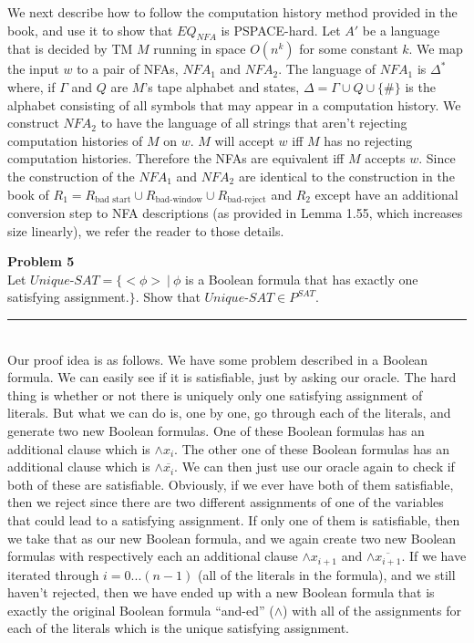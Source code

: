 \documentclass[paper=a4, fontsize=11pt]{scrartcl} %
\numberwithin{equation}{section} %
\numberwithin{figure}{section} %
\numberwithin{table}{section} %
\newcommand{\horrule}[1]{\rule{\linewidth}{#1}} %
\begin{document}
We next describe how to follow the computation history method provided in the book, and use it to show that $EQ_{NFA}$ is PSPACE-hard.  Let $A'$ be a language that is decided by TM $M$ running in space $O(n^k)$ for some constant $k$.  We map the input $w$ to a pair of NFAs, $NFA_1$ and $NFA_2$.  The language of $NFA_1$ is $\Delta^*$ where, if $\Gamma$ and $Q$ are $M$'s tape alphabet and states, $\Delta = \Gamma \cup Q \cup \{ \# \} $ is the alphabet consisting of all symbols that may appear in a computation history.  We construct $NFA_2$ to have the language of all strings that aren't rejecting computation histories of $M$ on $w$.  $M$ will accept $w$ iff $M$ has no rejecting computation histories.  Therefore the NFAs are equivalent iff $M$ accepts $w$.  Since the construction of the $NFA_1$ and $NFA_2$ are identical to the construction in the book of $R_1 = R_{\text{bad start}} \cup R_{\text{bad-window}} \cup R_{\text{bad-reject}}$ and $R_2$ except have an additional conversion step to NFA descriptions (as provided in Lemma 1.55, which increases size linearly), we refer the reader to those details.







\newpage

\textbf{Problem 5}
\\

Let $Unique$-$SAT = \{< \phi > \ | \ \phi$ is a Boolean formula that has exactly one satisfying assignment.$\}$.  Show that $Unique$-$SAT \in P^{SAT}$.

\horrule{1pt} 
\\

Our proof idea is as follows.  We have some problem described in a Boolean formula.  We can easily see if it is satisfiable, just by asking our oracle.  The hard thing is whether or not there is uniquely only one satisfying assignment of literals.  But what we can do is, one by one, go through each of the literals, and generate two new Boolean formulas.  One of these Boolean formulas has an additional clause which is $\wedge x_i$.  The other one of these Boolean formulas has an additional clause which is $\wedge \overline{x_i}$.  We can then just use our oracle again to check if both of these are satisfiable.  Obviously, if we ever have both of them satisfiable, then we reject since there are two different assignments of one of the variables that could lead to a satisfying assignment.  If only one of them is satisfiable, then we take that as our new Boolean formula, and we again create two new Boolean formulas with respectively each an additional clause $\wedge x_{i+1}$ and $\wedge \overline{x_{i+1}}$.  If we have iterated through $i = 0 ... (n-1)$ (all of the literals in the formula), and we still haven't rejected, then we have ended up with a new Boolean formula that is exactly the original Boolean formula ``and-ed'' ($\wedge$) with all of the assignments for each of the literals which is the unique satisfying assignment.\\
\end{document}
